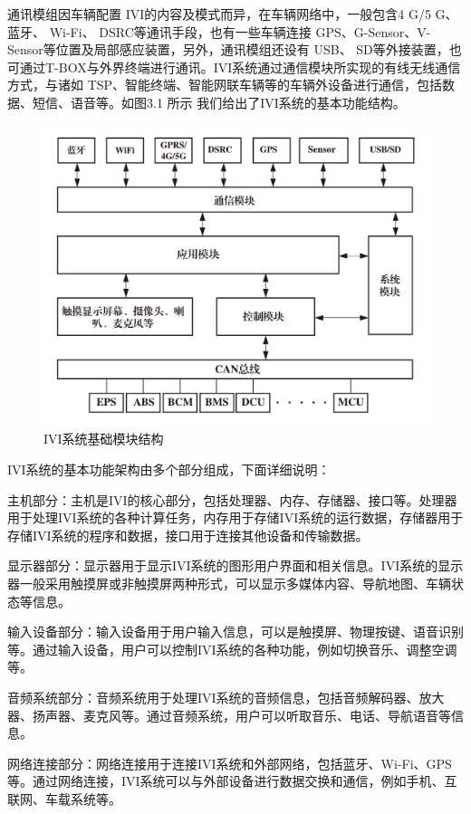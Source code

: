 通讯模组因车辆配置 IVI的内容及模式而异，在车辆网络中，一般包含4 G/5 G、蓝牙、 Wi-Fi、 DSRC等通讯手段，也有一些车辆连接 GPS、G-Sensor、V-Sensor等位置及局部感应装置，另外，通讯模组还设有 USB、 SD等外接装置，也可通过T-BOX与外界终端进行通讯。IVI系统通过通信模块所实现的有线无线通信方式，与诸如 TSP、智能终端、智能网联车辆等的车辆外设备进行通信，包括数据、短信、语音等。如图3.1 所示 我们给出了IVI系统的基本功能结构。
\begin{figure}
  \centering
  \includegraphics[scale=0.4]{resources/img/a50.jpg}
  \caption{IVI系统基础模块结构}
\end{figure}
IVI系统的基本功能架构由多个部分组成，下面详细说明：

主机部分：主机是IVI的核心部分，包括处理器、内存、存储器、接口等。处理器用于处理IVI系统的各种计算任务，内存用于存储IVI系统的运行数据，存储器用于存储IVI系统的程序和数据，接口用于连接其他设备和传输数据。

显示器部分：显示器用于显示IVI系统的图形用户界面和相关信息。IVI系统的显示器一般采用触摸屏或非触摸屏两种形式，可以显示多媒体内容、导航地图、车辆状态等信息。

输入设备部分：输入设备用于用户输入信息，可以是触摸屏、物理按键、语音识别等。通过输入设备，用户可以控制IVI系统的各种功能，例如切换音乐、调整空调等。

音频系统部分：音频系统用于处理IVI系统的音频信息，包括音频解码器、放大器、扬声器、麦克风等。通过音频系统，用户可以听取音乐、电话、导航语音等信息。

网络连接部分：网络连接用于连接IVI系统和外部网络，包括蓝牙、Wi-Fi、GPS等。通过网络连接，IVI系统可以与外部设备进行数据交换和通信，例如手机、互联网、车载系统等。

